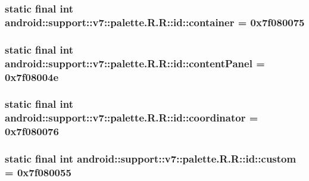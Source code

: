 \hypertarget{classandroid_1_1support_1_1v7_1_1palette_1_1_r_1_1id_30e743a3f1008b66471f200e61c58851}{
\subsubsection[{container}]{\setlength{\rightskip}{0pt plus 5cm}static final int android::support::v7::palette.R.R::id::container = 0x7f080075}}
\label{classandroid_1_1support_1_1v7_1_1palette_1_1_r_1_1id_30e743a3f1008b66471f200e61c58851}


\hypertarget{classandroid_1_1support_1_1v7_1_1palette_1_1_r_1_1id_49f0cf5c29aa696cdb2c7013de23ac01}{
\subsubsection[{contentPanel}]{\setlength{\rightskip}{0pt plus 5cm}static final int android::support::v7::palette.R.R::id::contentPanel = 0x7f08004e}}
\label{classandroid_1_1support_1_1v7_1_1palette_1_1_r_1_1id_49f0cf5c29aa696cdb2c7013de23ac01}


\hypertarget{classandroid_1_1support_1_1v7_1_1palette_1_1_r_1_1id_cdbcc2e7cd0f41b11d656acb3b778bca}{
\subsubsection[{coordinator}]{\setlength{\rightskip}{0pt plus 5cm}static final int android::support::v7::palette.R.R::id::coordinator = 0x7f080076}}
\label{classandroid_1_1support_1_1v7_1_1palette_1_1_r_1_1id_cdbcc2e7cd0f41b11d656acb3b778bca}


\hypertarget{classandroid_1_1support_1_1v7_1_1palette_1_1_r_1_1id_f9ace5018e608cc5dbf5a73f6f1b20a4}{
\subsubsection[{custom}]{\setlength{\rightskip}{0pt plus 5cm}static final int android::support::v7::palette.R.R::id::custom = 0x7f080055}}
\label{classandroid_1_1support_1_1v7_1_1palette_1_1_r_1_1id_f9ace5018e608cc5dbf5a73f6f1b20a4}


